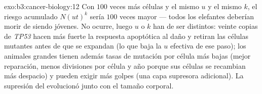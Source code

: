 \begin{solution}{exo:b3:cancer-biology:12}
Con $100$ veces más células y el mismo $u$ y el mismo $k$, el riesgo
acumulado $N(ut)^{k}$ sería $100$ veces mayor --- todos los elefantes
deberían morir de  siendo jóvenes. No ocurre, luego $u$ o $k$ han
de ser distintos: veinte copias de \emph{TP53} hacen más fuerte la
respuesta apoptótica al daño y retiran las células mutantes antes de que
se expandan (lo que baja la $u$ efectiva de ese paso); los animales
grandes tienen además tasas de mutación por célula más bajas (mejor
reparación, menos divisiones por célula y año porque sus células se
recambian más despacio) y pueden exigir más golpes (una capa supresora
adicional). La supresión del  evolucionó junto con el tamaño
corporal.
\end{solution}

